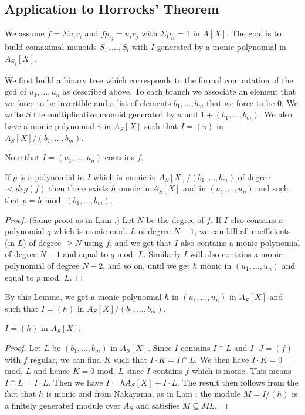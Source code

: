 \subsection{Application to Horrocks' Theorem}

We assume $f = \Sigma u_iv_i$ and $fp_{ij} = u_iv_j$ with $\Sigma p_{ii} = 1$
in $A[X]$. The goal is to build comaximal monoids $S_1,\dots,S_l$ with $I$ generated by
a monic polynomial in $A_{S_j}[X]$.

We first build a binary tree which corresponds to the formal computation of the gcd of
$u_1,\dots,u_n$ as described above. To each branch we associate an element that
we force to be invertible and a list of elements $b_1,\dots,b_m$ that we force to be $0$.
We write $S$ the multiplicative monoid generated by $a$ and $1 + (b_1,\dots,b_m)$.
We also have a monic polynomial $\gamma$ in $A_S[X]$ 
such that $I = (\gamma)$ in $A_S[X]/(b_1,\dots,b_m)$.

 Note that $I = (u_1,\dots,u_n)$ contains $f$.

\begin{lemma}
  If $p$ is a polynomial in $I$ which is monic in $A_S[X]/(b_1,\dots,b_m)$ of degree $<deg(f)$
  then there exists $h$ monic in
  $A_S[X]$ and in $(u_1,\dots,u_n)$ and such that $p=h$ mod. $(b_1,\dots,b_m)$.
\end{lemma}

\begin{proof}
  (Same proof as in Lam \cite{Lam}.) Let $N$ be the degree of $f$.
  If $I$ also contains a polynomial $q$ which is monic
  mod. $L$ of degree $N-1$, we can kill all coefficients (in $L$) of degree $\geqslant N$
  using $f$, and we get that $I$ also contains a monic polynomial of degree $N-1$
  and equal to $q$ mod. $L$.
  Similarly $I$ will also contains a monic polynomial of degree $N-2$, and so on, until
  we get $h$ monic in $(u_1,\dots,u_n)$ and equal to $p$ mod. $L$.
\end{proof}

By this Lemma, we get a monic polynomial $h$ in $(u_1,\dots,u_n)$ in $A_S[X]$
and such that $I=(h)$ in $A_S[X]/(b_1,\dots,b_m)$.

\begin{lemma}
 $I = (h)$ in $A_{S}[X]$.
\end{lemma}

\begin{proof}
  Let $L$ be $(b_1,\dots,b_m)$ in $A_S[X]$.
  Since $I$ contains $I\cap L$ and $I\cdot J = (f)$ with $f$ regular, we can find $K$
  such that $I\cdot K = I\cap L$.
  We then have $I\cdot K = 0$ mod. $L$ and hence $K = 0$ mod. $L$ since $I$ contains $f$
  which is monic.
  This means $I\cap L = I\cdot L$. Then we have $I = hA_S[X] + I\cdot L$.
  The result then follows from the fact that $h$ is monic and from Nakayama, as in Lam \cite{Lam}:
  the module $M = I/(h)$ is a finitely generated module over $A_S$ and satisfies
  $M\subseteq ML$.
\end{proof}

